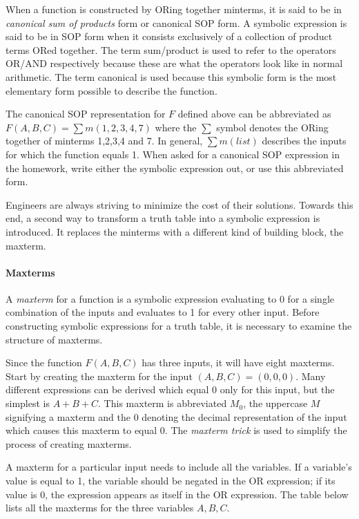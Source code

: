 When a function is constructed by ORing together minterms, it is
said to be in \textit{canonical sum of products} 
 form or canonical SOP form.  A symbolic
expression is said to be in SOP form when it consists
exclusively of a collection of product terms ORed together.  
The term sum/product is used to refer to the operators OR/AND 
respectively because these are what the operators look like in 
normal arithmetic. The term canonical is used because this 
symbolic form is the most elementary form possible to describe 
the function.

The canonical SOP representation for $F$ defined above can be 
abbreviated as $F(A,B,C) = \sum m(1,2,3,4,7)$  where the $\sum$
symbol denotes the ORing together of minterms 1,2,3,4 and 7.
In general, $\sum m(list)$ describes the inputs for which the
function equals 1.  When asked for a canonical SOP expression
in the homework, write either the symbolic expression
out, or use this abbreviated form.

Engineers are always striving to minimize the cost of their solutions.
Towards this end, a second way to transform a truth table into a 
symbolic expression is introduced.  It replaces the minterms with 
a different kind of building block, the maxterm.

\paragraph{Maxterms}
A \textit{maxterm} for a function is a symbolic expression evaluating
to 0 for a single combination of the inputs and evaluates to 1 for 
every other input.  Before constructing symbolic expressions for
a truth table, it is necessary to examine the structure of maxterms.

Since the function $F(A,B,C)$ has three inputs, it will have eight 
maxterms.  Start by creating the maxterm for the input $(A,B,C)=(0,0,0)$.
Many different expressions can be derived which equal 0 only for
this input, but the simplest is $A+B+C$.  This maxterm is
abbreviated $M_0$, the uppercase $M$ signifying a maxterm 
and the 0 denoting the decimal representation of the input which 
causes this maxterm to equal 0.  The \textit{maxterm trick} 
 is used to simplify the process of creating
maxterms.  

A maxterm for a particular input needs to include all the variables.
If a variable's value is equal to 1, the variable should be negated 
in the OR expression; if its value is 0, the expression appears as itself in the
OR expression. The table below lists all the maxterms for the three 
variables $A,B,C$.

